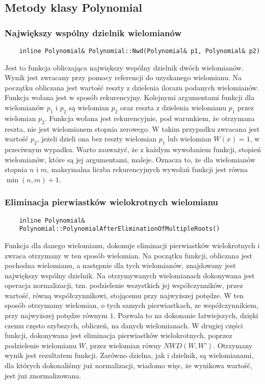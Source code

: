 \documentclass[oneside,a4paper]{book}
\begin{document}
	\subsection{Metody klasy Polynomial}
	
	\subsubsection{Największy wspólny dzielnik wielomianów}
	\begin{lstlisting}
	inline Polynomial& Polynomial::Nwd(Polynomial& p1, Polynomial& p2)
	\end{lstlisting}
	
	Jest to funkcja obliczająca największy wspólny dzielnik dwóch wielomianów. Wynik jest zwracany przy pomocy referencji do uzyskanego wielomianu. Na początku obliczana jest wartość reszty z dzielenia ilorazu podanych wielomianów. Funkcja wołana jest w sposób rekurencyjny. Kolejnymi argumentami funkcji dla wielomianów $p_1$ i $p_2$ są wielomian $p_2$ oraz reszta z dzielenia wielomianu $p_1$ przez wielomian $p_2$. Funkcja wołana jest rekurencyjnie, pod warunkiem, że otrzymana reszta, nie jest wielomianem stopnia zerowego. W takim przypadku zwracana jest wartość $p_2$, jeżeli dzieli ona bez reszty wielomian $p_1$ lub wielomian $W(x)=1$, w przeciwnym wypadku. Warto zauważyć, że z każdym wywołaniem funkcji, stopień wielomianów, które są jej argumentami, maleje. Oznacza to, że dla wielomianów stopnia $n$ i $m$, maksymalna liczba rekurencyjnych wywołań funkcji jest równa $\min(n,m)+1$.
	\\
	
	\subsubsection{Eliminacja pierwiastków wielokrotnych wielomianu}
	\begin{lstlisting}
	inline Polynomial&
	Polynomial::PolynomialAfterEliminationOfMultipleRoots()
	\end{lstlisting}
	
	Funkcja dla danego wielomianu, dokonuje eliminacji pierwiastków wielokrotnych i zwraca otrzymany w ten sposób wielomian. Na początku funkcji, obliczana jest pochodna wielomianu, a następnie dla tych wielomianów, znajdowany jest największy wspólny dzielnik. Na otrzymywanych wielomianach dokonywana jest operacja normalizacji, tzn. podzielenie wszystkich jej współczynników, przez wartość, równą współczynnikowi, stojącemu przy najwyższej potędze. W ten sposób otrzymamy wielomian, o tych samych pierwiastkach, ze współczynnikiem, przy najwyższej potędze równym $1$. Pozwala to na dokonanie łatwiejszych, dzięki czemu często szybszych, obliczeń, na danych wielomianach. W drugiej części funkcji, dokonywana jest eliminacja pierwiastków wielokrotnych, poprzez podzielenie wielomianu $W$, przez wielomian równy $NWD(W, W’)$. Otrzymany wynik jest rezultatem funkcji. Zarówno dzielna, jak i dzielnik, są wielomianami, dla których dokonaliśmy już normalizacji, wiadomo więc, że wynikowa wartość, jest już znormalizowana.
	\\
	
\end{document}
